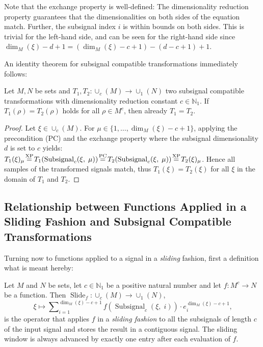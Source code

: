 \documentclass[journal]{IEEEtran}
\newcommand{\N}{\mathbb{N}}
\newcommand{\discint}[2]{\{#1,\dotsc,#2\}}
\newcommand{\inint}[2]{\in\discint{#1}{#2}}
\DeclareMathOperator{\Subsignal}{Subsignal}
\DeclareMathOperator{\Slide}{Slide}
\newcommand{\equsing}[1]{\overset{\mathclap{\text{#1}}}{=}}
\begin{document}
Note that the exchange property is well-defined:
The dimensionality reduction property guarantees that the dimensionalities on both sides of the equation match.
Further, the subsignal index $i$ is within bounds on both sides.
This is trivial for the left-hand side, and can be seen for the right-hand side since $\dim_M(\xi) - d + 1 = (\dim_M(\xi) - c + 1) - (d - c + 1) + 1$.

An identity theorem for subsignal compatible transformations immediately follows:
\begin{theorem}
\label{thm:subsignal-identity}
Let $M,N$ be sets and $T_1,T_2\colon\cup_c(M)\to\cup_1(N)$ two subsignal compatible transformations with dimensionality reduction constant $c\in\N_1$.
If $T_1(\rho) = T_2(\rho)$ holds for all $\rho\in M^c$, then already $T_1 = T_2$.
\end{theorem}
\begin{proof}
Let $\xi\in\cup_c(M)$.
For $\mu\inint{1}{\dim_M(\xi) - c + 1}$, applying the precondition (PC) and the exchange property where the subsignal dimensionality $d$ is set to $c$ yields:
$T_1(\xi)_\mu \equsing{XP} T_1(\Subsignal_c(\xi,\;\mu)) \equsing{PC} T_2(\Subsignal_c(\xi,\;\mu)) \equsing{XP} T_2(\xi)_\mu$.
Hence all samples of the transformed signals match, thus $T_1(\xi) = T_2(\xi)$ for all $\xi$ in the domain of $T_1$ and $T_2$.
\end{proof}

\subsection{Relationship between Functions Applied in a Sliding Fashion and Subsignal Compatible Transformations}
Turning now to functions applied to a signal in a \emph{sliding} fashion, first a definition what is meant hereby:
\begin{definition}
\label{def:sliding-function}
Let $M$ and $N$ be sets, let $c\in\N_1$ be a positive natural number and let $f\colon M^c\to N$ be a function.
Then $\Slide_f\colon\cup_c(M)\to\cup_1(N)$,
\begin{displaymath}
  \xi\mapsto\sum\nolimits_{i = 1}^{\dim_M(\xi) - c + 1} f(\Subsignal_c(\xi,\;i))\cdot e_i^{\dim_M(\xi) - c + 1}\text{,}
\end{displaymath}
is the operator that applies $f$ in a \emph{sliding fashion} to all the subsignals of length $c$ of the input signal and stores the result in a contiguous signal.
The sliding window is always advanced by exactly one entry after each evaluation of $f$.
\end{definition}
\end{document}
